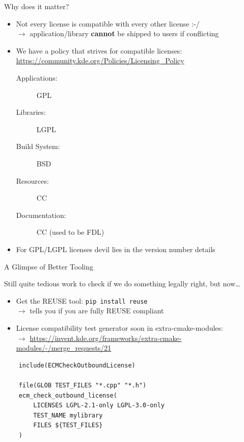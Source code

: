 \documentclass[t,compress,aspectratio=169]{beamer}
\begin{document}
\begin{frame}
    {Why does it matter?}

    \begin{itemize}
        \item Not every license is compatible with every other license :-/\\
            $\rightarrow$ application/library \textbf{cannot} be shipped to users if conflicting
        \item We have a policy that strives for compatible licenses:\\
            \url{https://community.kde.org/Policies/Licensing_Policy}\\
            \begin{description}
                \item [Applications:] GPL
                \item [Libraries:] LGPL
                \item [Build System:] BSD
                \item [Resources:] CC
                \item [Documentation:] CC (used to be FDL)
            \end{description}
        \item For GPL/LGPL licenses devil lies in the version number details
    \end{itemize}
\end{frame}

\begin{frame}[fragile]
    {A Glimpse of Better Tooling}

    Still quite tedious work to check if we do something legally right, but now\dots
    \begin{itemize}
        \item Get the REUSE tool: \texttt{pip install reuse}\\
            $\rightarrow$ tells you if you are fully REUSE compliant
        \item License compatibility test generator soon in extra-cmake-modules:\\
            $\rightarrow$ \url{https://invent.kde.org/frameworks/extra-cmake-modules/-/merge_requests/21}
    \end{itemize}

    \begin{example}
    \tiny
    \begin{verbatim}
    include(ECMCheckOutboundLicense)

    file(GLOB TEST_FILES "*.cpp" "*.h")
    ecm_check_outbound_license(
        LICENSES LGPL-2.1-only LGPL-3.0-only
        TEST_NAME mylibrary
        FILES ${TEST_FILES}
    )
    \end{verbatim}
    \end{example}
\end{frame}
\end{document}

